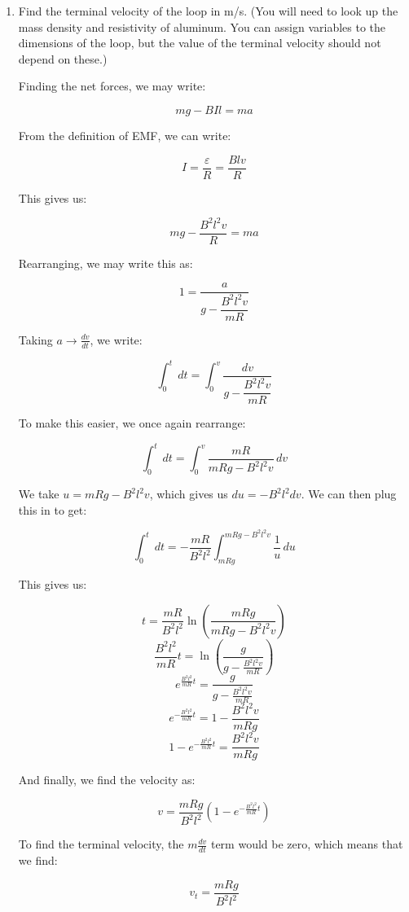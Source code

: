 \begin{enumerate}
    \begin{enumerate}

      \item Find the terminal velocity of the loop in m/s.  (You will need to look up the mass density and resistivity of aluminum. You can assign variables to the dimensions of the loop, but the value of the terminal velocity should not depend on these.)

        Finding the net forces, we may write:

        $$mg-BIl=ma$$

        From the definition of EMF, we can write:

        $$I=\frac{\varepsilon}{R}=\frac{Blv}{R}$$

        This gives us:

        $$mg-\frac{B^2l^2v}{R}=ma$$

        Rearranging, we may write this as:

        $$1=\frac{a}{g-\dfrac{B^2l^2v}{mR}}$$

        Taking $a\to\frac{dv}{dt}$, we write:

        $$\int_0^t\,dt=\int_0^v\frac{dv}{g-\dfrac{B^2l^2v}{mR}}$$

        To make this easier, we once again rearrange:

        $$\int_0^t\,dt=\int_0^v\frac{mR}{mRg-B^2l^2v}\,dv$$

        We take $u=mRg-B^2l^2v$, which gives us $du=-B^2l^2dv$. We can then plug this in to get:

        $$\int_0^t\,dt=-\frac{mR}{B^2l^2}\int_{mRg}^{mRg-B^2l^2v}\frac{1}{u}\,du$$

        This gives us:

        $$t=\frac{mR}{B^2l^2}\ln\left(  \frac{mRg}{mRg-B^2l^2v}\right)$$
        $$\frac{B^2l^2}{mR}t=\ln\left(  \frac{g}{g-\frac{B^2l^2v}{mR}}\right)$$
        $$e^{\frac{B^2l^2}{mR}t}=\frac{g}{g-\frac{B^2l^2v}{mR}}$$
        $$e^{-\frac{B^2l^2}{mR}t}=1-\frac{B^2l^2v}{mRg}$$
        $$1-e^{-\frac{B^2l^2}{mR}t}=\frac{B^2l^2v}{mRg}$$

        And finally, we find the velocity as:

        $$v=\frac{mRg}{B^2l^2}\left( 1-e^{-\frac{B^2l^2}{mR}t} \right)$$

        To find the terminal velocity, the $m\frac{dv}{dt}$ term would be zero, which means that we find:

        $$v_t=\frac{mRg}{B^2l^2}$$


\end{enumerate}
\end{enumerate}
